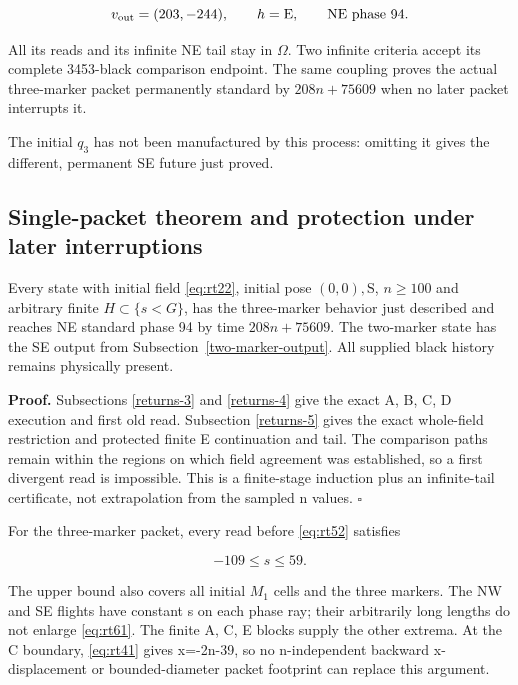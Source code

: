 \begin{equation}\label{eq:rt52}
v_{\rm out}=(203,-244),\qquad h=\mathrm E,\qquad\text{NE phase }94.
\end{equation}

All its reads and its infinite NE tail stay in $\Omega$. Two infinite
criteria accept its complete 3453-black comparison endpoint. The same
coupling proves the actual three-marker packet permanently standard by
$208n+75609$ when no later packet interrupts it.

The initial $q_3$ has not been manufactured by this process: omitting it
gives the different, permanent SE future just proved.

\subsection{Single-packet theorem and protection under later
interruptions}\label{returns-6}

\begin{theorem}\label{th:return-one} Every state with initial field \eqref{eq:rt22}, initial pose
$(0,0),\mathrm S$, $n\ge100$ and arbitrary finite $H\subset\{s<G\}$, has the three-marker
behavior just described and reaches NE standard phase 94 by time
$208n+75609$. The two-marker state has the SE output from Subsection~\ref{two-marker-output}. All supplied black history remains physically
present.
\end{theorem}

\textbf{Proof.} Subsections \ref{returns-3} and \ref{returns-4} give the exact A, B, C, D execution and
first old read. Subsection \ref{returns-5} gives the exact whole-field
restriction and protected finite E continuation and tail. The comparison
paths remain within the regions on which field agreement was
established, so a first divergent read is impossible. This is a
finite-stage induction plus an infinite-tail certificate, not
extrapolation from the sampled n values. \(\square\)

For the three-marker packet, every read before \eqref{eq:rt52} satisfies

\begin{equation}\label{eq:rt61}
-109\le s\le59.
\end{equation}

The upper bound also covers all initial $M_1$ cells and the three markers.
The NW and SE flights have constant s on each phase ray; their
arbitrarily long lengths do not enlarge \eqref{eq:rt61}. The finite A, C, E blocks
supply the other extrema. At the C boundary, \eqref{eq:rt41} gives x=-2n-39, so no
n-independent backward x-displacement or bounded-diameter packet
footprint can replace this argument.

